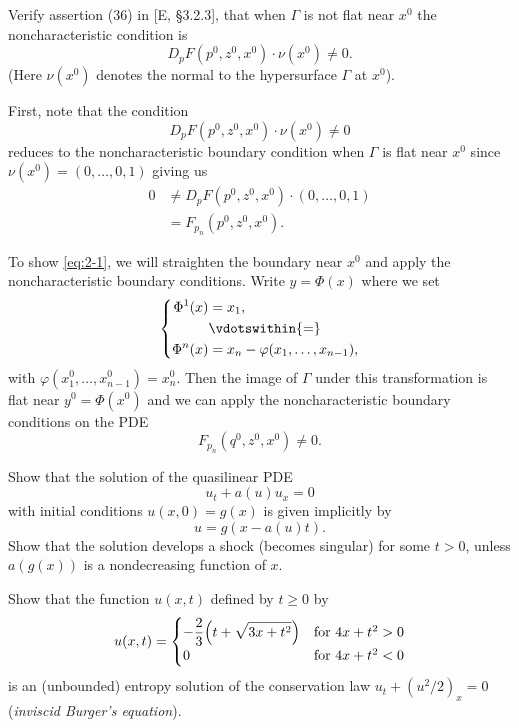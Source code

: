 \begin{problem}
  Verify assertion (36) in [E, \S 3.2.3], that when \(\Gamma\) is not flat
  near \(x^0\) the noncharacteristic condition is
  \[
    D_pF(p^0,z^0,x^0)\cdot \nu(x^0)\neq 0.
  \]
  (Here \(\nu(x^0)\) denotes the normal to the hypersurface \(\Gamma\) at
  \(x^0\)).
\end{problem}
\begin{solution}
  First, note that the condition
  \begin{equation}
    \label{eq:2-1}
    D_pF(p^0,z^0,x^0)\cdot \nu(x^0)\neq 0
  \end{equation}
  reduces to the noncharacteristic boundary condition when \(\Gamma\) is
  flat near \(x^0\) since \(\nu(x^0)=(0,\dotsc,0,1)\) giving us
  \begin{align*}
    0&\neq D_pF(p^0,z^0,x^0)\cdot (0,\dotsc,0,1)\\
     &=F_{p_n}(p^0,z^0,x^0).
  \end{align*}

  To show \eqref{eq:2-1}, we will straighten the boundary near \(x^0\) and
  apply the noncharacteristic boundary conditions. Write \(y=\Phi(x)\)
  where we set
  \[
    \left\{
      \begin{aligned}
        \Phi^1(x)&=x_1,\\
        &\vdotswithin{=}\\
        \Phi^n(x)&=x_n-\varphi(x_1,\dotsc,x_{n-1}),
      \end{aligned}
    \right.
  \]
  with \(\varphi(x_1^0,\dotsc,x_{n-1}^0)=x_n^0\). Then the image of
  \(\Gamma\) under this transformation is flat near \(y^0=\Phi(x^0)\) and
  we can apply the noncharacteristic boundary conditions on the PDE
  \[
    F_{p_n}(q^0,z^0,x^0)\neq 0.
  \]
\end{solution}
\newpage

\begin{problem}
  Show that the solution of the quasilinear PDE
  \[
    u_t+a(u)u_x=0
  \]
  with initial conditions \(u(x,0)=g(x)\) is given implicitly by
  \[
    u=g(x-a(u)t).
  \]
  Show that the solution develops a shock (becomes singular) for some
  \(t>0\), unless \(a(g(x))\) is a nondecreasing function of
  \(x\).
\end{problem}
\begin{solution}

\end{solution}
\newpage

\begin{problem}
  Show that the function \(u(x,t)\) defined by \(t\geq 0\) by
  \[
    u(x,t)=
    \begin{cases}
      \displaystyle-\frac{2}{3}\Bigl(t+\sqrt{3x+t^2}\Bigr)
      &\text{for \(4x+t^2>0\)}\\
      0
      &\text{for \(4x+t^2<0\)}
    \end{cases}
  \]
  is an (unbounded) entropy solution of the conservation law
  \(u_t+(u^2/2)_x=0\) (\emph{inviscid Burger's equation}).
\end{problem}
\begin{solution}
\end{solution}

